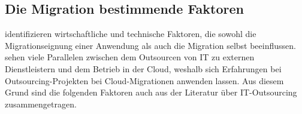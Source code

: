 \subsection{Die Migration bestimmende Faktoren}
\label{cha:migration_bestimmende_faktoren}
 identifizieren wirtschaftliche und technische Faktoren,
die sowohl die Migrationseignung einer Anwendung als auch die Migration selbst
beeinflussen. \\
 sehen viele
Parallelen zwischen dem Outsourcen von IT zu externen
Dienstleistern und dem Betrieb in der Cloud, weshalb sich Erfahrungen bei
Outsourcing-Projekten bei Cloud-Migrationen
anwenden lassen. Aus diesem Grund sind die folgenden Faktoren auch aus der
Literatur über IT-Outsourcing zusammengetragen.
